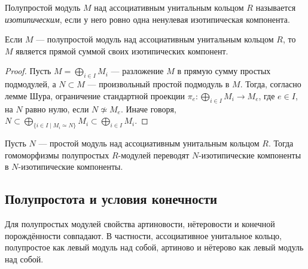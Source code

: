 \documentclass[
	extrafontsizes,
	11pt,
	hyphens,
]{memoir}
\begin{document}
\begin{definition}
Полупростой модуль \(M\) над ассоциативным унитальным кольцом \(R\) называется \emph{изо\-ти\-пи\-чес\-ким}, если у него ровно одна ненулевая изотипическая компонента.
\end{definition}

\begin{theorem}\label{thm:semisimple_isot_decomp}
Если \(M\) --- полупростой модуль над ассоциативным унитальным кольцом \(R\), то \(M\) является прямой суммой своих изотипических компонент.
\end{theorem}

\begin{proof}
Пусть \(M = \bigoplus_{i \in I} M_i\) --- разложение \(M\) в прямую сумму простых подмодулей, а \(N \subset M\) --- произвольный простой подмодуль в \(M\). Тогда, согласно лемме Шура, ограничение стандартной проекции \(\pi_e : \bigoplus_{i \in I} M_i \to M_e\), где \(e \in I\), на \(N\) равно нулю, если \(N \not\simeq M_e\).
Иначе говоря, \(N \subset \bigoplus_{\{i \in I \mid M_i \simeq N\}} M_i \subset \bigoplus_{i \in I} M_i\).
\end{proof}


\begin{observation}
\label{obs:IsotCompFunc}
Пусть \(N\) --- простой модуль над ассоциативным унитальным кольцом \(R\).
Тогда гомоморфизмы полупростых \(R\)-модулей переводят \(N\)-изотипические компоненты в \(N\)-изотипические компоненты.
\end{observation}

\subsection{Полупростота и условия конечности}

\begin{observation}
Для полупростых модулей свойства артиновости, нётеровости и конечной порождённости совпадают.
В частности, ассоциативное унитальное кольцо, полупростое как левый модуль над собой, артиново и нётерово как левый модуль над собой.
\end{observation}
\end{document}
